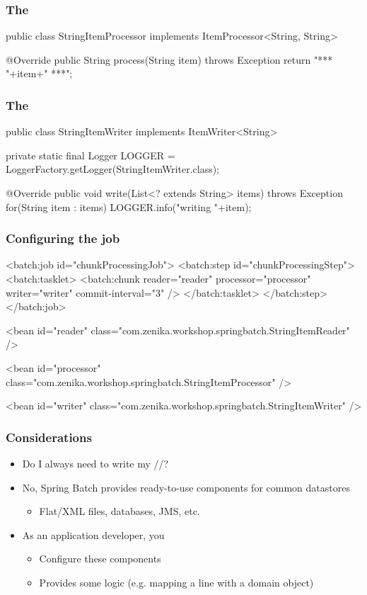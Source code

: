 \begin{frame}[fragile]
\frametitle{The }
\begin{javacode}
public class StringItemProcessor implements ItemProcessor<String, String> {

  @Override
  public String process(String item) throws Exception {
    return "*** "+item+" ***";
  }

}
\end{javacode}
\end{frame}

\begin{frame}[fragile]
\frametitle{The }
\begin{javacode}
public class StringItemWriter implements ItemWriter<String> {

  private static final Logger LOGGER =
    LoggerFactory.getLogger(StringItemWriter.class);

  @Override
  public void write(List<? extends String> items) throws Exception {
    for(String item : items) {
      LOGGER.info("writing "+item);
    }
  }

}
\end{javacode}
\end{frame}

\begin{frame}[fragile]
\frametitle{Configuring the job}
\begin{javacode}
<batch:job id="chunkProcessingJob">
  <batch:step id="chunkProcessingStep">
    <batch:tasklet>
      <batch:chunk reader="reader" processor="processor" writer="writer"
                   commit-interval="3"
      />
    </batch:tasklet>
  </batch:step>
</batch:job>

<bean id="reader" class="com.zenika.workshop.springbatch.StringItemReader" />

<bean id="processor" 
      class="com.zenika.workshop.springbatch.StringItemProcessor" />

<bean id="writer" class="com.zenika.workshop.springbatch.StringItemWriter" />
\end{javacode}
\end{frame}

\begin{frame}
 \frametitle{Considerations}
 \begin{itemize}
  \item Do I always need to write my //?
  \item No, Spring Batch provides ready-to-use components for common datastores
  \begin{itemize}
    \item Flat/XML files, databases, JMS, etc.
  \end{itemize}
  \item As an application developer, you
  \begin{itemize}
    \item Configure these components
    \item Provides some logic (e.g. mapping a line with a domain object)
  \end{itemize}
 \end{itemize}
\end{frame}

